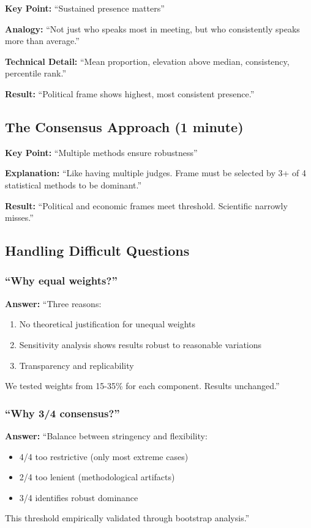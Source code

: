 \documentclass[11pt]{article}
\begin{document}
\textbf{Key Point:} ``Sustained presence matters''

\textbf{Analogy:} ``Not just who speaks most in meeting, but who consistently speaks more than average.''

\textbf{Technical Detail:} ``Mean proportion, elevation above median, consistency, percentile rank.''

\textbf{Result:} ``Political frame shows highest, most consistent presence.''

\subsection{The Consensus Approach (1 minute)}

\textbf{Key Point:} ``Multiple methods ensure robustness''

\textbf{Explanation:} ``Like having multiple judges. Frame must be selected by 3+ of 4 statistical methods to be dominant.''

\textbf{Result:} ``Political and economic frames meet threshold. Scientific narrowly misses.''

\subsection{Handling Difficult Questions}

\subsubsection{``Why equal weights?''}

\textbf{Answer:} ``Three reasons:
\begin{enumerate}
    \item No theoretical justification for unequal weights
    \item Sensitivity analysis shows results robust to reasonable variations
    \item Transparency and replicability
\end{enumerate}
We tested weights from 15-35\% for each component. Results unchanged.''

\subsubsection{``Why 3/4 consensus?''}

\textbf{Answer:} ``Balance between stringency and flexibility:
\begin{itemize}
    \item 4/4 too restrictive (only most extreme cases)
    \item 2/4 too lenient (methodological artifacts)
    \item 3/4 identifies robust dominance
\end{itemize}
This threshold empirically validated through bootstrap analysis.''
\end{document}
